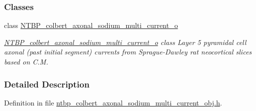 \subsubsection*{Classes}
\begin{DoxyCompactItemize}
\item 
class \hyperlink{class_n_t_b_p__colbert__axonal__sodium__multi__current__o}{NTBP\_\-colbert\_\-axonal\_\-sodium\_\-multi\_\-current\_\-o}
\begin{DoxyCompactList}\small\item\em \hyperlink{class_n_t_b_p__colbert__axonal__sodium__multi__current__o}{NTBP\_\-colbert\_\-axonal\_\-sodium\_\-multi\_\-current\_\-o} class Layer 5 pyramidal cell axonal (past initial segment) currents from Sprague-\/Dawley rat neocortical slices based on C.M. \item\end{DoxyCompactList}\end{DoxyCompactItemize}


\subsubsection{Detailed Description}


Definition in file \hyperlink{ntbp__colbert__axonal__sodium__multi__current__obj_8h_source}{ntbp\_\-colbert\_\-axonal\_\-sodium\_\-multi\_\-current\_\-obj.h}.

